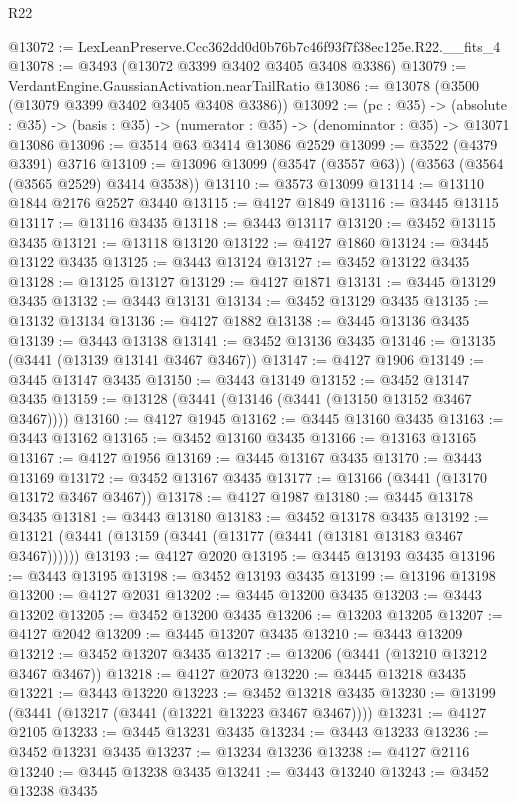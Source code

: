 \begin{lexlean}{R22}
\begin{coremodule}
@13072 := LexLeanPreserve.Ccc362dd0d0b76b7c46f93f7f38ec125e.R22.__fits_4
@13078 := @3493 (@13072 @3399 @3402 @3405 @3408 @3386)
@13079 := VerdantEngine.GaussianActivation.nearTailRatio
@13086 := @13078 (@3500 (@13079 @3399 @3402 @3405 @3408 @3386))
@13092 := (pc : @35) ->
  (absolute : @35) -> (basis : @35) -> (numerator : @35) -> (denominator : @35) -> @13071 @13086
@13096 := @3514 @63 @3414 @13086 @2529
@13099 := @3522 (@4379 @3391) @3716
@13109 := @13096 @13099 (@3547 (@3557 @63)) (@3563 (@3564 (@3565 @2529) @3414 @3538))
@13110 := @3573 @13099
@13114 := @13110 @1844 @2176 @2527 @3440
@13115 := @4127 @1849
@13116 := @3445 @13115
@13117 := @13116 @3435
@13118 := @3443 @13117
@13120 := @3452 @13115 @3435
@13121 := @13118 @13120
@13122 := @4127 @1860
@13124 := @3445 @13122 @3435
@13125 := @3443 @13124
@13127 := @3452 @13122 @3435
@13128 := @13125 @13127
@13129 := @4127 @1871
@13131 := @3445 @13129 @3435
@13132 := @3443 @13131
@13134 := @3452 @13129 @3435
@13135 := @13132 @13134
@13136 := @4127 @1882
@13138 := @3445 @13136 @3435
@13139 := @3443 @13138
@13141 := @3452 @13136 @3435
@13146 := @13135 (@3441 (@13139 @13141 @3467 @3467))
@13147 := @4127 @1906
@13149 := @3445 @13147 @3435
@13150 := @3443 @13149
@13152 := @3452 @13147 @3435
@13159 := @13128 (@3441 (@13146 (@3441 (@13150 @13152 @3467 @3467))))
@13160 := @4127 @1945
@13162 := @3445 @13160 @3435
@13163 := @3443 @13162
@13165 := @3452 @13160 @3435
@13166 := @13163 @13165
@13167 := @4127 @1956
@13169 := @3445 @13167 @3435
@13170 := @3443 @13169
@13172 := @3452 @13167 @3435
@13177 := @13166 (@3441 (@13170 @13172 @3467 @3467))
@13178 := @4127 @1987
@13180 := @3445 @13178 @3435
@13181 := @3443 @13180
@13183 := @3452 @13178 @3435
@13192 := @13121 (@3441 (@13159 (@3441 (@13177 (@3441 (@13181 @13183 @3467 @3467))))))
@13193 := @4127 @2020
@13195 := @3445 @13193 @3435
@13196 := @3443 @13195
@13198 := @3452 @13193 @3435
@13199 := @13196 @13198
@13200 := @4127 @2031
@13202 := @3445 @13200 @3435
@13203 := @3443 @13202
@13205 := @3452 @13200 @3435
@13206 := @13203 @13205
@13207 := @4127 @2042
@13209 := @3445 @13207 @3435
@13210 := @3443 @13209
@13212 := @3452 @13207 @3435
@13217 := @13206 (@3441 (@13210 @13212 @3467 @3467))
@13218 := @4127 @2073
@13220 := @3445 @13218 @3435
@13221 := @3443 @13220
@13223 := @3452 @13218 @3435
@13230 := @13199 (@3441 (@13217 (@3441 (@13221 @13223 @3467 @3467))))
@13231 := @4127 @2105
@13233 := @3445 @13231 @3435
@13234 := @3443 @13233
@13236 := @3452 @13231 @3435
@13237 := @13234 @13236
@13238 := @4127 @2116
@13240 := @3445 @13238 @3435
@13241 := @3443 @13240
@13243 := @3452 @13238 @3435

\end{coremodule}
\end{lexlean}
